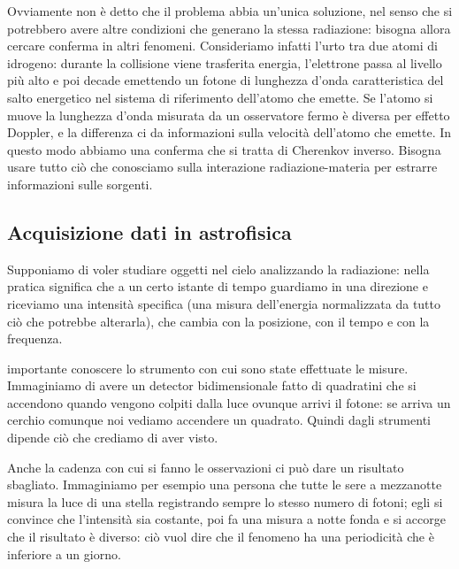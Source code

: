 Ovviamente non è detto che il problema abbia un'unica soluzione, nel senso che si potrebbero avere altre condizioni che generano la stessa radiazione: bisogna allora cercare conferma in altri fenomeni. Consideriamo infatti l'urto tra due atomi di idrogeno: durante la collisione viene trasferita energia, l'elettrone passa al livello più alto e poi decade emettendo un fotone di lunghezza d'onda caratteristica del salto energetico nel sistema di riferimento dell'atomo che emette. Se l'atomo si muove la lunghezza d'onda misurata da un osservatore fermo è diversa per effetto Doppler, e la differenza ci da informazioni sulla velocità dell'atomo che emette. In questo modo abbiamo una conferma che si tratta di Cherenkov inverso.
Bisogna usare tutto ciò che conosciamo sulla interazione radiazione-materia per estrarre informazioni sulle sorgenti.

\subsection{Acquisizione dati in astrofisica}
Supponiamo di voler studiare oggetti nel cielo analizzando la radiazione: nella pratica significa che a un certo istante di tempo guardiamo in una direzione e riceviamo una intensità specifica (una misura dell'energia normalizzata da tutto ciò che potrebbe alterarla), che cambia con la posizione, con il tempo e con la frequenza.

\E importante conoscere lo strumento con cui sono state effettuate le misure. Immaginiamo di avere un detector bidimensionale fatto di quadratini che si accendono quando vengono colpiti dalla luce ovunque arrivi il fotone: se arriva un cerchio comunque noi vediamo accendere un quadrato. Quindi dagli strumenti dipende ciò che crediamo di aver visto.

Anche la cadenza con cui si fanno le osservazioni ci può dare un risultato sbagliato. Immaginiamo per esempio una persona che tutte le sere a mezzanotte misura la luce di una stella registrando sempre lo stesso numero di fotoni; egli si convince che l'intensità sia costante, poi fa una misura a notte fonda e si accorge che il risultato è diverso: ciò vuol dire che il fenomeno ha una periodicità che è inferiore a un giorno.

